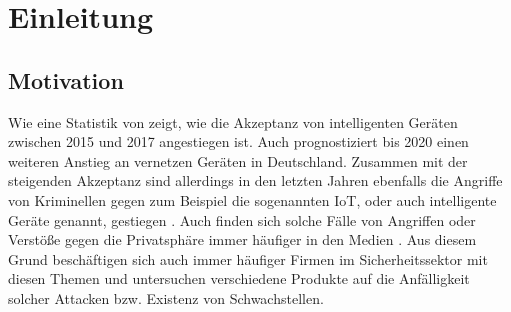 \chapter{Einleitung}

\section{Motivation}
Wie eine Statistik von \cite{nier_2017} zeigt, wie die Akzeptanz von intelligenten Geräten zwischen 2015 und 2017 angestiegen ist. Auch %
prognostiziert bis 2020 einen weiteren Anstieg an vernetzen Geräten in Deutschland.
Zusammen mit der steigenden Akzeptanz sind allerdings in den letzten Jahren ebenfalls die Angriffe von Kriminellen gegen zum Beispiel die sogenannten \ac{IoT}, oder auch intelligente Geräte genannt, gestiegen
.
Auch finden sich solche Fälle von Angriffen oder Verstöße gegen die Privatsphäre immer häufiger in den Medien %
. Aus diesem Grund beschäftigen sich auch immer häufiger Firmen im Sicherheitssektor mit diesen Themen und untersuchen verschiedene Produkte auf die Anfälligkeit solcher Attacken bzw. Existenz von Schwachstellen.

